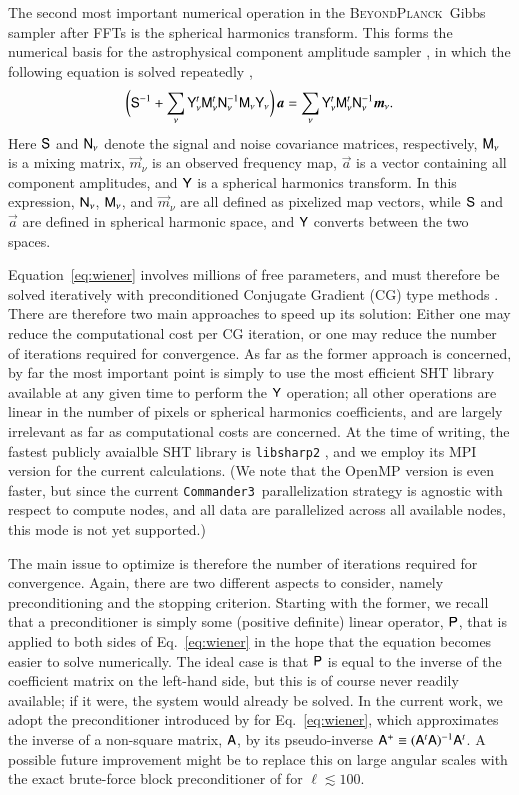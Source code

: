 \documentclass[twocolumn]{aa}
\def\commanderthree{\texttt{Commander3}}
\newcommand{\A}[0]{\tens{A}}
\newcommand{\Y}[0]{\tens{Y}}
\renewcommand{\a}[0]{\vec{a}}
\newcommand{\m}[0]{\vec{m}}
\newcommand{\N}[0]{\tens{N}}
\newcommand{\M}[0]{\tens{M}}
\renewcommand{\S}[0]{\tens{S}}
\renewcommand{\P}[0]{\tens{P}}
\newcommand{\BP}{\textsc{BeyondPlanck}}
\begin{document}
The second most important numerical operation in the \BP\ Gibbs
sampler after FFTs is the spherical harmonics transform. This forms
the numerical basis for the astrophysical component amplitude sampler
\citep{BP13}, in which the following equation is solved repeatedly
\citep{seljebotn:2019},
\begin{equation}
\biggl(\S^{-1} +
\sum_{\nu}\Y^t_{\nu}\M^t_{\nu}\N_{\nu}^{-1}\M_{\nu}\Y_{\nu}\biggr)\,\a
= \sum_\nu\Y_{\nu}^t\M_\nu^t\N_\nu^{-1}\m_{\nu}.
\label{eq:wiener}
\end{equation}
Here $\S$ and $\N_\nu$ denote the signal and noise covariance
matrices, respectively, $\M_{\nu}$ is a mixing matrix, $\m_{\nu}$ is
an observed frequency map, $\a$ is a vector containing all component
amplitudes, and $\Y$ is a spherical harmonics transform. In this
expression, $\N_{\nu}$, $\M_{\nu}$, and $\m_{\nu}$ are all defined as
pixelized map vectors, while $\S$ and $\a$ are defined in spherical
harmonic space, and $\Y$ converts between the two spaces.

Equation~\eqref{eq:wiener} involves millions of free parameters, and
must therefore be solved iteratively with preconditioned Conjugate
Gradient (CG) type methods \citep{shewchuk:1994}. There are therefore
two main approaches to speed up its solution: Either one may reduce
the computational cost per CG iteration, or one may reduce the number
of iterations required for convergence. As far as the former approach
is concerned, by far the most important point is simply to use the
most efficient SHT library available at any given time to perform the
$\Y$ operation; all other operations are linear in the number of
pixels or spherical harmonics coefficients, and are largely irrelevant
as far as computational costs are concerned. At the time of writing,
the fastest publicly avaialble SHT library is \texttt{libsharp2}
\citep{reinecke2013}, and we employ its MPI version for the current
calculations. (We note that the OpenMP version is even faster, but
since the current \commanderthree\ parallelization strategy is
agnostic with respect to compute nodes, and all data are parallelized
across all available nodes, this mode is not yet supported.)

The main issue to optimize is therefore the number of iterations
required for convergence. Again, there are two different aspects to
consider, namely preconditioning and the stopping criterion. Starting
with the former, we recall that a preconditioner is simply some
(positive definite) linear operator, $\P$, that is applied to both
sides of Eq.~\eqref{eq:wiener} in the hope that the equation becomes
easier to solve numerically. The ideal case is that $\P$ is equal to
the inverse of the coefficient matrix on the left-hand side, but this
is of course never readily available; if it were, the system would
already be solved. In the current work, we adopt the preconditioner
introduced by \citet{seljebotn:2019} for Eq.~\eqref{eq:wiener}, which
approximates the inverse of a non-square matrix, $\A$, by its
pseudo-inverse $\A^{+}\equiv(\A^t\A)^{-1}\A^t$. A possible future
improvement might be to replace this on large angular scales with the
exact brute-force block preconditioner of
\citet{eriksen:2004,eriksen2008} for $\ell\lesssim 100$.
\end{document}
